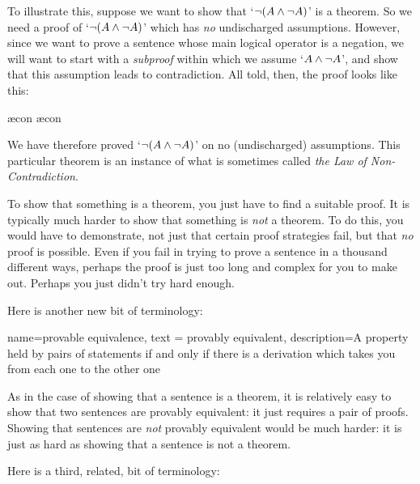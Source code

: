To illustrate this, suppose we want to show that `$\neg (A \wedge \neg A)$' is a theorem.  So we need a proof of `$\neg(A \wedge \neg A)$' which has \emph{no} undischarged assumptions. However, since we want to prove a sentence whose main logical operator is a negation, we will want to start with a \emph{subproof} within which we assume `$A \wedge \neg A$', and show that this assumption leads to contradiction. All told, then, the proof looks like this:
	\begin{fitchproof}
		\open
			\ae{con}
			\ae{con}
		\close
	\end{fitchproof}
We have therefore proved `$\neg (A \wedge \neg A)$' on no (undischarged) assumptions. This particular theorem is an instance of what is sometimes called \emph{the Law of Non-Contradiction}.

To show that something is a theorem, you just have to find a suitable proof. It is typically much harder to show that something is \emph{not} a theorem. To do this, you would have to demonstrate, not just that certain proof strategies fail, but that \emph{no} proof is possible. Even if you fail in trying to prove a sentence in a thousand different ways, perhaps the proof is just too long and complex for you to make out. Perhaps you just didn't try hard enough.

Here is another new bit of terminology:
        
{
  name=provable equivalence,
  text = provably equivalent,
description={A property held by pairs of statements if and only if there is a derivation which takes you from each one to the other one}
}


As in the case of showing that a sentence is a theorem, it is relatively easy to show that two sentences are provably equivalent: it just requires a pair of proofs. Showing that sentences are \emph{not} provably equivalent would be much harder: it is just as hard as showing that a sentence is not a theorem.

Here is a third, related, bit of terminology:
        
